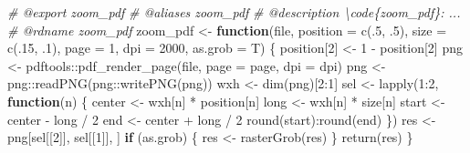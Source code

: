 \documentclass[
]{article}
\newenvironment{Shaded}{\begin{snugshade}}{\end{snugshade}}
\newcommand{\AttributeTok}[1]{\textcolor[rgb]{0.77,0.63,0.00}{#1}}
\newcommand{\CommentTok}[1]{\textcolor[rgb]{0.56,0.35,0.01}{\textit{#1}}}
\newcommand{\ControlFlowTok}[1]{\textcolor[rgb]{0.13,0.29,0.53}{\textbf{#1}}}
\newcommand{\DecValTok}[1]{\textcolor[rgb]{0.00,0.00,0.81}{#1}}
\newcommand{\FunctionTok}[1]{\textcolor[rgb]{0.00,0.00,0.00}{#1}}
\newcommand{\NormalTok}[1]{#1}
\newcommand{\OtherTok}[1]{\textcolor[rgb]{0.56,0.35,0.01}{#1}}
\newcommand{\SpecialCharTok}[1]{\textcolor[rgb]{0.00,0.00,0.00}{#1}}
\begin{document}
\begin{Shaded}
\begin{Highlighting}[]
\CommentTok{\#\textquotesingle{} @export zoom\_pdf}
\CommentTok{\#\textquotesingle{} @aliases zoom\_pdf}
\CommentTok{\#\textquotesingle{} @description \textbackslash{}code\{zoom\_pdf\}: ...}
\CommentTok{\#\textquotesingle{} @rdname zoom\_pdf}
\NormalTok{zoom\_pdf }\OtherTok{\textless{}{-}} \ControlFlowTok{function}\NormalTok{(file, }\AttributeTok{position =} \FunctionTok{c}\NormalTok{(.}\DecValTok{5}\NormalTok{, .}\DecValTok{5}\NormalTok{), }\AttributeTok{size =} \FunctionTok{c}\NormalTok{(.}\DecValTok{15}\NormalTok{, .}\DecValTok{1}\NormalTok{), }\AttributeTok{page =} \DecValTok{1}\NormalTok{, }\AttributeTok{dpi =} \DecValTok{2000}\NormalTok{,}
  \AttributeTok{as.grob =}\NormalTok{ T)}
\NormalTok{\{}
\NormalTok{  position[}\DecValTok{2}\NormalTok{] }\OtherTok{\textless{}{-}} \DecValTok{1} \SpecialCharTok{{-}}\NormalTok{ position[}\DecValTok{2}\NormalTok{]}
\NormalTok{  png }\OtherTok{\textless{}{-}}\NormalTok{ pdftools}\SpecialCharTok{::}\FunctionTok{pdf\_render\_page}\NormalTok{(file, }\AttributeTok{page =}\NormalTok{ page, }\AttributeTok{dpi =}\NormalTok{ dpi)}
\NormalTok{  png }\OtherTok{\textless{}{-}}\NormalTok{ png}\SpecialCharTok{::}\FunctionTok{readPNG}\NormalTok{(png}\SpecialCharTok{::}\FunctionTok{writePNG}\NormalTok{(png))}
\NormalTok{  wxh }\OtherTok{\textless{}{-}} \FunctionTok{dim}\NormalTok{(png)[}\DecValTok{2}\SpecialCharTok{:}\DecValTok{1}\NormalTok{]}
\NormalTok{  sel }\OtherTok{\textless{}{-}} \FunctionTok{lapply}\NormalTok{(}\DecValTok{1}\SpecialCharTok{:}\DecValTok{2}\NormalTok{,}
    \ControlFlowTok{function}\NormalTok{(n) \{}
\NormalTok{      center }\OtherTok{\textless{}{-}}\NormalTok{ wxh[n] }\SpecialCharTok{*}\NormalTok{ position[n]}
\NormalTok{      long }\OtherTok{\textless{}{-}}\NormalTok{ wxh[n] }\SpecialCharTok{*}\NormalTok{ size[n]}
\NormalTok{      start }\OtherTok{\textless{}{-}}\NormalTok{ center }\SpecialCharTok{{-}}\NormalTok{ long }\SpecialCharTok{/} \DecValTok{2}
\NormalTok{      end }\OtherTok{\textless{}{-}}\NormalTok{ center }\SpecialCharTok{+}\NormalTok{ long }\SpecialCharTok{/} \DecValTok{2}
      \FunctionTok{round}\NormalTok{(start)}\SpecialCharTok{:}\FunctionTok{round}\NormalTok{(end)}
\NormalTok{    \})}
\NormalTok{  res }\OtherTok{\textless{}{-}}\NormalTok{ png[sel[[}\DecValTok{2}\NormalTok{]], sel[[}\DecValTok{1}\NormalTok{]], ]}
  \ControlFlowTok{if}\NormalTok{ (as.grob) \{}
\NormalTok{    res }\OtherTok{\textless{}{-}} \FunctionTok{rasterGrob}\NormalTok{(res)}
\NormalTok{  \}}
  \FunctionTok{return}\NormalTok{(res)}
\NormalTok{\}}
\end{Highlighting}
\end{Shaded}
\end{document}

